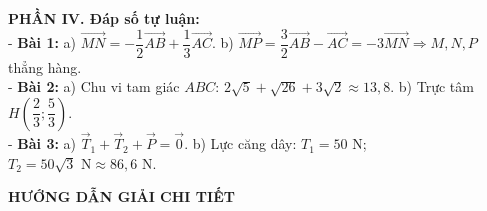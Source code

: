 \documentclass[10pt,a4paper]{article}
\begin{document}
\vspace{5pt}
\noindent\textbf{PHẦN IV. Đáp số tự luận:}\\[2pt]
- \textbf{Bài 1:} a) $\vec{MN} = -\dfrac{1}{2}\vec{AB} + \dfrac{1}{3}\vec{AC}$. b) $\vec{MP} = \dfrac{3}{2}\vec{AB} - \vec{AC} = -3\vec{MN} \Rightarrow M, N, P$ thẳng hàng.\\
- \textbf{Bài 2:} a) Chu vi tam giác $ABC$: $2\sqrt{5} + \sqrt{26} + 3\sqrt{2} \approx 13{,}8$. b) Trực tâm $H\left(\dfrac{2}{3}; \dfrac{5}{3}\right)$.\\
- \textbf{Bài 3:} a) $\vec{T}_1 + \vec{T}_2 + \vec{P} = \vec{0}$. b) Lực căng dây: $T_1 = 50\text{ N}$; $T_2 = 50\sqrt{3}\text{ N} \approx 86{,}6\text{ N}$.

\vspace{4pt}
\begin{center}
  {\large\bfseries\color{ink} HƯỚNG DẪN GIẢI CHI TIẾT}
\end{center}
\vspace{1pt}
\end{document}
